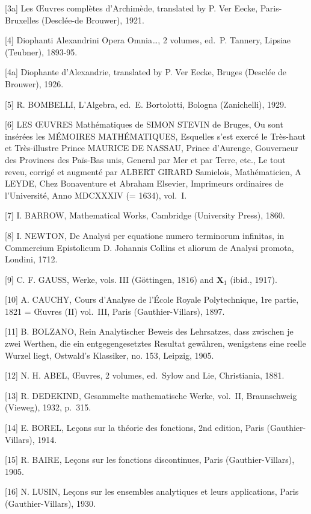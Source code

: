{[}3a{]} Les Œuvres complètes d'Archimède, translated by P. Ver Eecke, Paris-Bruxelles (Desclée-de Brouwer), 1921.

{[}4{]} Diophanti Alexandrini Opera Omnia\ldots, 2 volumes, ed.~P. Tannery, Lipsiae (Teubner), 1893-95.

{[}4a{]} Diophante d'Alexandrie, translated by P. Ver Eecke, Bruges (Desclée de Brouwer), 1926.

{[}5{]} R. BOMBELLI, L'Algebra, ed.~E. Bortolotti, Bologna (Zanichelli), 1929.

{[}6{]} LES ŒUVRES Mathématiques de SIMON STEVIN de Bruges, Ou sont insérées les MÉMOIRES MATHÉMATIQUES, Esquelles s'est exercé le Très-haut et Très-illustre Prince MAURICE DE NASSAU, Prince d'Aurenge, Gouverneur des Provinces des Païs-Bas unis, General par Mer et par Terre, etc., Le tout reveu, corrigé et augmenté par ALBERT GIRARD Samielois, Mathématicien, A LEYDE, Chez Bonaventure et Abraham Elsevier, Imprimeurs ordinaires de l'Université, Anno MDCXXXIV (= 1634), vol.~I.

{[}7{]} I. BARROW, Mathematical Works, Cambridge (University Press), 1860.

{[}8{]} I. NEWTON, De Analysi per equatione numero terminorum infinitas, in Commercium Epistolicum D. Johannis Collins et aliorum de Analysi promota, Londini, 1712.

{[}9{]} C. F. GAUSS, Werke, vols. III (Göttingen, 1816) and \(\mathbf{X}_1\) (ibid., 1917).

{[}10{]} A. CAUCHY, Cours d'Analyse de l'École Royale Polytechnique, 1re partie, 1821 = Œuvres (II) vol.~III, Paris (Gauthier-Villars), 1897.

{[}11{]} B. BOLZANO, Rein Analytischer Beweis des Lehrsatzes, dass zwischen je zwei Werthen, die ein entgegengesetztes Resultat gewähren, wenigstens eine reelle Wurzel liegt, Ostwald's Klassiker, no. 153, Leipzig, 1905.

{[}12{]} N. H. ABEL, Œuvres, 2 volumes, ed.~Sylow and Lie, Christiania, 1881.

{[}13{]} R. DEDEKIND, Gesammelte mathematische Werke, vol.~II, Braunschweig (Vieweg), 1932, p.~315.

{[}14{]} E. BOREL, Leçons sur la théorie des fonctions, 2nd edition, Paris (Gauthier-Villars), 1914.

{[}15{]} R. BAIRE, Leçons sur les fonctions discontinues, Paris (Gauthier-Villars), 1905.

{[}16{]} N. LUSIN, Leçons sur les ensembles analytiques et leurs applications, Paris (Gauthier-Villars), 1930.

